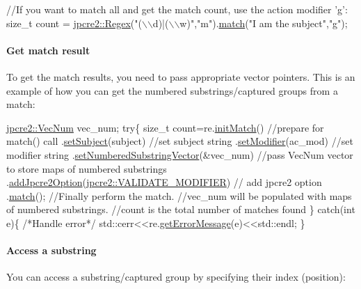 \begin{DoxyCode}
\textcolor{comment}{//If you want to match all and get the match count, use the action modifier 'g':}
\textcolor{keywordtype}{size\_t} count = \hyperlink{classjpcre2_1_1Regex}{jpcre2::Regex}(\textcolor{stringliteral}{"(\(\backslash\)\(\backslash\)d)|(\(\backslash\)\(\backslash\)w)"},\textcolor{stringliteral}{"m"}).\hyperlink{classjpcre2_1_1Regex_ab93775a93a0a537d09b9e9ab4a5a3894}{match}(\textcolor{stringliteral}{"I am the subject"},\textcolor{stringliteral}{"g"});
\end{DoxyCode}
\hypertarget{index_do-match}{}\paragraph{Get match result}\label{index_do-match}
To get the match results, you need to pass appropriate vector pointers. This is an example of how you can get the numbered substrings/captured groups from a match\+:


\begin{DoxyCode}
\hyperlink{namespacejpcre2_ac1cf752c8fbb0be78020be3b80e77ce3}{jpcre2::VecNum} vec\_num;
\textcolor{keywordflow}{try}\{
    \textcolor{keywordtype}{size\_t} count=re.\hyperlink{classjpcre2_1_1Regex_a519b0915bf1163c6ce6a4d674b30cfcd}{initMatch}()                                 \textcolor{comment}{//prepare for match() call}
                   .\hyperlink{classjpcre2_1_1RegexMatch_a635c652195deaa8ebb9e107c4f972aab}{setSubject}(subject)                         \textcolor{comment}{//set subject string}
                   .\hyperlink{classjpcre2_1_1RegexMatch_a9df7e92f96b61553f62720cb8f5f23e5}{setModifier}(ac\_mod)                         \textcolor{comment}{//set modifier string}
                   .\hyperlink{classjpcre2_1_1RegexMatch_a2c7efe1ec2e13827f670db4ecedcd0a0}{setNumberedSubstringVector}(&vec\_num)        \textcolor{comment}{//pass VecNum
       vector to store maps of numbered substrings}
                   .\hyperlink{classjpcre2_1_1RegexMatch_a0a4cf8554a7e00f3cf2db34f60a43f60}{addJpcre2Option}(\hyperlink{namespacejpcre2_a85c143271501e383843f45b9999c2f00a9124b768bcae4d51430aa7f26126f387}{jpcre2::VALIDATE\_MODIFIER})  \textcolor{comment}{//
      add jpcre2 option}
                   .\hyperlink{classjpcre2_1_1RegexMatch_a5868aef3a146594ea1ebef34d122bb33}{match}();                                    \textcolor{comment}{//Finally perform the match.}
    \textcolor{comment}{//vec\_num will be populated with maps of numbered substrings.}
    \textcolor{comment}{//count is the total number of matches found}
\}
\textcolor{keywordflow}{catch}(\textcolor{keywordtype}{int} e)\{
    \textcolor{comment}{/*Handle error*/}
    std::cerr<<re.\hyperlink{classjpcre2_1_1Regex_a92b75c438ccff871205b2175a6141fd5}{getErrorMessage}(e)<<std::endl;
\}
\end{DoxyCode}
 \hypertarget{index_access-substring}{}\paragraph{Access a substring}\label{index_access-substring}
You can access a substring/captured group by specifying their index (position)\+:


